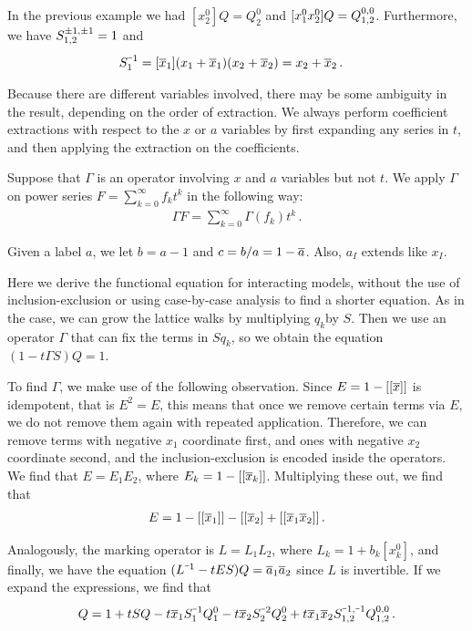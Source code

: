 \begin{exa}In the previous example we had $[x_2^0]Q = Q_2^0$ and $[x_1^0x_2^0]Q = Q_{1,2}^{0,0}$. Furthermore, we have $S_{1,2}^{\pm 1,\pm1}  = 1$ and 
\begin{align}
	S_1^{\um 1} &= [\ol x_1](x_1 + \ol x_1)(x_2 + \ol x_2) = x_2 + \ol x_2\,.
\end{align}
\end{exa}

Because there are different variables involved, there may be some ambiguity in the result, depending on the order of extraction. We always perform coefficient extractions with respect to the $x$ or $a$ variables by first expanding any series in $t$, and then applying the extraction on the coefficients.
\begin{defn} Suppose that $\Gamma$ is an operator involving $x$ and $a$ variables but not $t$. We apply $\Gamma$ on power series $F = \sum_{k=0}^\infty f_k t^k$ in the following way:
\begin{align}
	\Gamma F = \sum_{k=0}^\infty \Gamma (f_k) t^k\,.
\end{align}
\end{defn}

\begin{defn} Given a label $a$, we let $b = a - 1$ and $c = b/a = 1 - \overline{a}$. Also, $a_I$ extends like $x_I$.
\end{defn}

\begin{exa} Here we derive the \twoD functional equation for \classic interacting models, without the use of inclusion-exclusion or using case-by-case analysis to find a shorter equation. As in the \oneD case, we can grow the lattice walks by multiplying $q_k$by $S$. Then we use an operator $\Gamma$ that can fix the terms in $Sq_k$, so we obtain the equation $(1-t\Gamma S)Q = 1$. 

To find $\Gamma$, we make use of the following observation. Since $E = 1- [[\overline{x}]]$ is idempotent, that is $E^2 = E$, this means that once we remove certain terms via $E$, we do not remove them again with repeated application. Therefore, we can remove terms with negative $x_1$ coordinate first, and ones with negative $x_2$ coordinate second, and the inclusion-exclusion is encoded inside the operators. We find that $E = E_1E_2$, where $E_k = 1 - [[\overline{x}_k]]$. Multiplying these out, we find that
\begin{align}
	E = 1 - [[\overline{x}_1]] - [[\overline{x}_2] + [[\overline{x}_1 \overline{x}_2]]\,.
\end{align}

Analogously, the marking operator is $L = L_1 L_2$, where $L_k = 1+b_k[x_k^0]$, and finally, we have the equation $(L^{\um 1} - tES)Q = \ol a_1 \ol a_2$ since $L$ is invertible. If we expand the expressions, we find that
\begin{align}
	Q = 1 + t SQ - t\ol x_1S_1^{\um 1}Q_1^0 - t\ol x_2S_2^{\um 2}Q_2^0 + t\ol x_1\ol x_2\Sf{\um 1,\um 1}\Qf{0,0}\,.
\end{align}
\end{exa}

